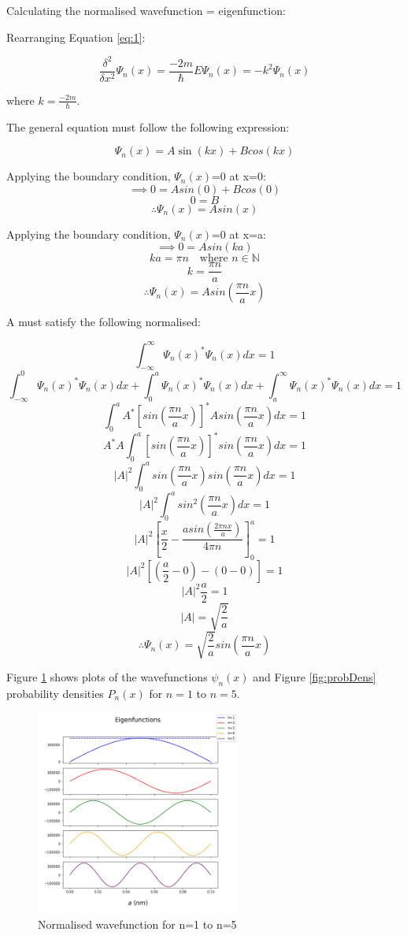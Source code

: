 Calculating the normalised wavefunction = eigenfunction:

Rearranging Equation \ref{eq:1}:

$$\frac{\delta^{2}}{\delta x^{2}}\Psi_n (x) = \frac{-2m}{\hbar} E \Psi_n (x) = -k^2 \Psi_n (x)$$

where $k=\frac{-2m}{\hbar}$.

The general equation must follow the following expression:

$$\Psi_n (x) = A \sin(kx) + B cos(kx)$$ %

Applying the boundary condition, $\Psi_n (x)$=0 at x=0:
$$\implies 0 = A sin(0) + B cos(0)$$
$$ 0 = B$$
$$\therefore \Psi_n (x) = A sin(x)$$

Applying the boundary condition, $\Psi_n (x)$=0 at x=a:
$$\implies 0 = A sin(ka)$$ %
$$ ka = \pi n \quad \text{where } n \in \mathbb{N}$$
$$ k = \frac{\pi n}{a}$$
$$\therefore \Psi_n (x) = A sin(\frac{\pi n}{a}x)$$

A must satisfy the following normalised:

$$\int_{ -\infty}^{\infty}\Psi_n (x)^{*}\Psi_n (x)dx = 1$$
$$\int_{ -\infty}^{0}\Psi_n (x)^{*}\Psi_n (x)dx +\int_{0}^{a}\Psi_n (x)^{*}\Psi_n (x)dx + \int_{ a}^{\infty}\Psi_n (x)^{*}\Psi_n (x)dx= 1$$
$$\int_{ 0}^{a} A^{*} [sin(\frac{\pi n}{a}x)]^{*}A sin(\frac{\pi n}{a}x)dx = 1$$
$$A^{*}A\int_{ 0}^{a} [sin(\frac{\pi n}{a}x)]^{*}sin(\frac{\pi n}{a}x)dx = 1$$
$$\left | A \right |^2 \int_{ 0}^{a} sin(\frac{\pi n}{a}x) sin(\frac{\pi n}{a}x)dx = 1$$
$$\left | A \right |^2 \int_{ 0}^{a} sin^{2}(\frac{\pi n}{a}x)dx = 1$$
$$\left | A \right |^2 \left[\frac{x}{2}-\frac{asin(\frac{2 \pi nx}{a})}{4 \pi n}\right]_0^a= 1$$
$$\left | A \right |^2 [(\frac{a}{2}-0)-(0-0)]= 1$$
$$\left | A \right |^2 \frac{a}{2}= 1$$
$$\left | A \right | = \sqrt{\frac{2}{a}}$$
$$\therefore \Psi_n (x) = \sqrt{\frac{2}{a}} sin(\frac{\pi n}{a}x)$$ %

Figure \ref{fig:normWave} shows plots of the wavefunctions $\psi_n(x)$ and Figure \ref{fig:probDens} probability densities $P_n(x)$ for $n=1$ to $n=5$. 
 
\begin{figure}[h]
    \centering
    \includegraphics[width=0.6\textwidth]{lab1/images/normalisedWavefunction.png}
    \caption{Normalised wavefunction for n=1 to n=5}
    \label{fig:normWave}
\end{figure}

